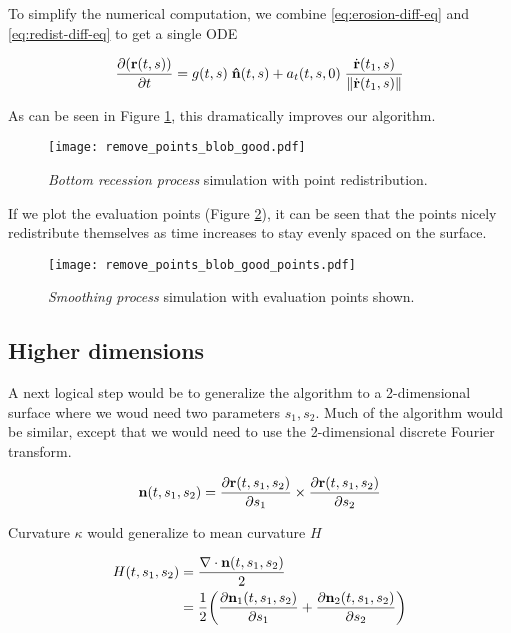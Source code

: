 To simplify the numerical computation, we combine \ref{eq:erosion-diff-eq} and \ref{eq:redist-diff-eq} to get a single ODE

\begin{equation}
  \frac{\partial (\bvec{r}(t, s))}{\partial t} = g(t, s) \; \bhat{n}(t, s) + a_t(t, s, 0) \; \frac{\dot{\bvec{r}}(t_1, s)}{\norm{\dot{\bvec{r}}(t_1, s)}}
\end{equation}

As can be seen in Figure \ref{fig:remove-points-blob-good}, this dramatically improves our algorithm.

\begin{figure}[h!]
    \begin{center}
      \texttt{[image: remove\_points\_blob\_good.pdf]}
    \end{center}
  \vspace{-.2in} %
  \caption{\label{fig:remove-points-blob-good}\textit{Bottom recession process} simulation with point redistribution.}
\end{figure}

If we plot the evaluation points (Figure \ref{fig:remove-points-blob-good-points}), it can be seen that the points nicely redistribute themselves as time increases to stay evenly spaced on the surface.

\begin{figure}[h!]
    \begin{center}
      \texttt{[image: remove\_points\_blob\_good\_points.pdf]}
    \end{center}
  \vspace{-.2in} %
  \caption{\label{fig:remove-points-blob-good-points}\textit{Smoothing process} simulation with evaluation points shown.}
\end{figure}

\subsection*{Higher dimensions}

A next logical step would be to generalize the algorithm to a 2-dimensional surface where we woud need two parameters $s_1, s_2$. Much of the algorithm would be similar, except that we would need to use the 2-dimensional discrete Fourier transform.

\[
  \mathbf{n}(t, s_1, s_2) = \frac{\partial \mathbf{r}(t, s_1, s_2)}{\partial s_1} \times \frac{\partial \mathbf{r}(t, s_1, s_2)}{\partial s_2} 
\]

Curvature $\kappa$ would generalize to mean curvature $H$

\begin{align*}
  H(t, s_1, s_2)& = \frac{\nabla \cdot \bvec{n}(t, s_1, s_2)}{2}\\
  &= \frac{1}{2} \paren{\frac{\partial \bvec{n}_1(t, s_1, s_2)}{\partial s_1} + \frac{\partial \bvec{n}_2(t, s_1, s_2)}{\partial s_2}}
\end{align*}

